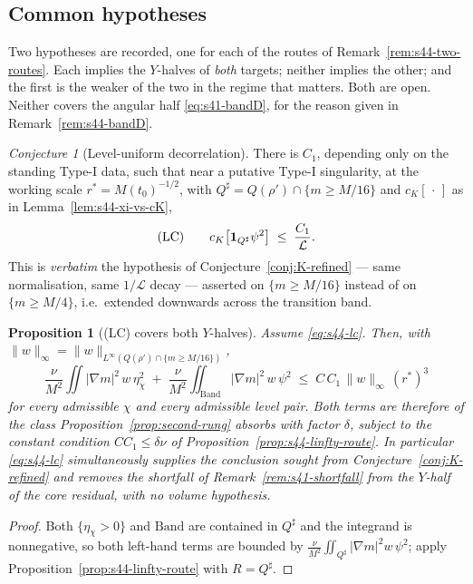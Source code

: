 \documentclass[11pt]{article}
\newtheorem{proposition}[theorem]{Proposition}
\theoremstyle{definition}
\theoremstyle{remark}
\newtheorem{conjecture}[theorem]{Conjecture}
\begin{document}
\subsection{Common hypotheses}
\label{subsec:s44-common}

Two hypotheses are recorded, one for each of the routes of
Remark~\ref{rem:s44-two-routes}. Each implies the $Y$-halves of \emph{both}
targets; neither implies the other; and the first is the weaker of the two in
the regime that matters. Both are open. Neither covers the angular half
\eqref{eq:s41-bandD}, for the reason given in Remark~\ref{rem:s44-bandD}.

\begin{conjecture}[Level-uniform decorrelation]\label{conj:lc-s44}
  There is $C_1$, depending only on the standing Type-I data, such that near a
  putative Type-I singularity, at the working scale $r^*=M(t_0)^{-1/2}$, with
  $Q^\sharp=Q(\rho')\cap\{m\geq M/16\}$ and $c_K[\,\cdot\,]$ as in
  Lemma~\ref{lem:s44-xi-vs-cK},
  \begin{equation}\label{eq:s44-lc}
    \textup{(LC)}\qquad
    c_K\bigl[\mathbf{1}_{Q^\sharp}\psi^2\bigr]
    \;\leq\;\frac{C_1}{\mathcal{L}} .
  \end{equation}
  This is \emph{verbatim} the hypothesis of Conjecture~\ref{conj:K-refined} ---
  same normalisation, same $1/\mathcal{L}$ decay --- asserted on
  $\{m\geq M/16\}$ instead of on $\{m\geq M/4\}$, i.e.\ extended downwards
  across the transition band.
\end{conjecture}

\begin{proposition}[(LC) covers both $Y$-halves]\label{prop:s44-lc-implies}
  Assume \eqref{eq:s44-lc}. Then, with
  $\|w\|_\infty=\|w\|_{L^\infty(Q(\rho')\cap\{m\geq M/16\})}$,
  \[
    \frac{\nu}{M^2}\iint|\nabla m|^2\,w\,\eta_\chi^2
    \;+\;\frac{\nu}{M^2}\iint_{\mathrm{Band}}|\nabla m|^2\,w\,\psi^2
    \;\leq\; C\,C_1\,\|w\|_\infty\,(r^*)^3
  \]
  for every admissible $\chi$ and every admissible level pair. Both terms are
  therefore of the class Proposition~\ref{prop:second-rung} absorbs with
  factor $\delta$, subject to the constant condition $CC_1\leq\delta\nu$ of
  Proposition~\ref{prop:s44-linfty-route}. In particular \eqref{eq:s44-lc}
  simultaneously supplies the conclusion sought from
  Conjecture~\ref{conj:K-refined} and removes the shortfall of
  Remark~\ref{rem:s41-shortfall} from the $Y$-half of the core residual, with
  \emph{no} volume hypothesis.
\end{proposition}
\begin{proof}
  Both $\{\eta_\chi>0\}$ and $\mathrm{Band}$ are contained in $Q^\sharp$ and
  the integrand is nonnegative, so both left-hand terms are bounded by
  $\tfrac{\nu}{M^2}\iint_{Q^\sharp}|\nabla m|^2w\,\psi^2$; apply
  Proposition~\ref{prop:s44-linfty-route} with $R=Q^\sharp$.
\end{proof}
\end{document}
